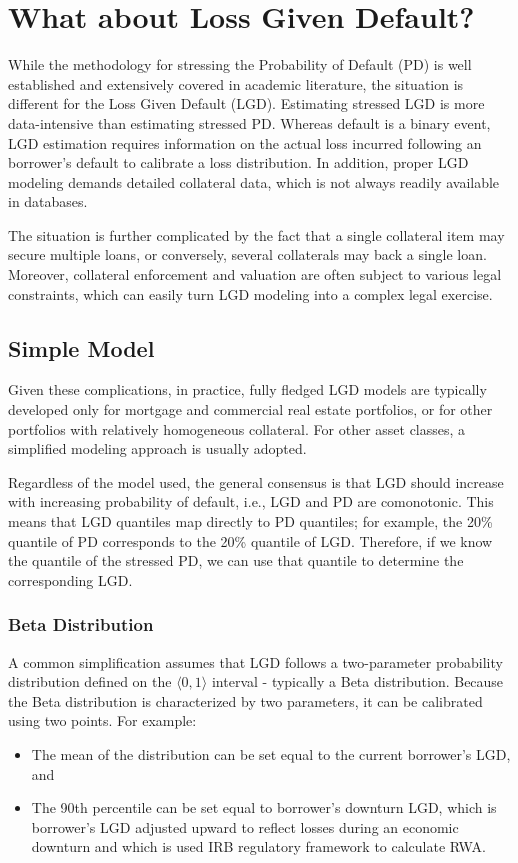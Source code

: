 \documentclass[11pt,a4paper]{article}
\begin{document}
\section{What about Loss Given Default?}

While the methodology for stressing the Probability of Default (PD) is well established and extensively covered in academic literature, the situation is different for the Loss Given Default (LGD). Estimating stressed LGD is more data-intensive than estimating stressed PD. Whereas default is a binary event, LGD estimation requires information on the actual loss incurred following an borrower’s default to calibrate a loss distribution. In addition, proper LGD modeling demands detailed collateral data, which is not always readily available in databases.

The situation is further complicated by the fact that a single collateral item may secure multiple loans, or conversely, several collaterals may back a single loan. Moreover, collateral enforcement and valuation are often subject to various legal constraints, which can easily turn LGD modeling into a complex legal exercise.

\subsection{Simple Model}

Given these complications, in practice, fully fledged LGD models are typically developed only for mortgage and commercial real estate portfolios, or for other portfolios with relatively homogeneous collateral. For other asset classes, a simplified modeling approach is usually adopted.

Regardless of the model used, the general consensus is that LGD should increase with increasing probability of default, i.e., LGD and PD are comonotonic. This means that LGD quantiles map directly to PD quantiles; for example, the 20\% quantile of PD corresponds to the 20\% quantile of LGD. Therefore, if we know the quantile of the stressed PD, we can use that quantile to determine the corresponding LGD.

\subsubsection{Beta Distribution}

A common simplification assumes that LGD follows a two-parameter probability distribution defined on the $\langle 0, 1 \rangle$ interval - typically a Beta distribution. Because the Beta distribution is characterized by two parameters, it can be calibrated using two points. For example:
\begin{itemize}
    \item The mean of the distribution can be set equal to the current borrower's LGD, and
    \item The 90th percentile can be set equal to borrower's downturn LGD, which is borrower's LGD adjusted upward to reflect losses during an economic downturn and which is used IRB regulatory framework to calculate RWA.
\end{itemize}
\end{document}

